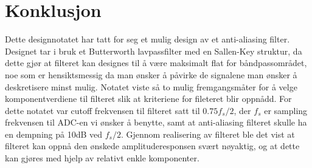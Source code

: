 \newpage
\section{Konklusjon}
\label{konklusjon}

Dette designnotatet har tatt for seg et mulig design av et anti-aliasing filter. Designet tar i bruk et Butterworth lavpassfilter med en Sallen-Key struktur, da dette gjør at filteret kan designes til å være maksimalt flat for båndpassområdet, noe som er 
hensiktsmessig da man ønsker å påvirke de signalene man ønsker å deskretisere minst mulig. Notatet viste så to mulig fremgangsmåter for å velge komponentverdiene til filteret slik at kriteriene for fileteret blir oppnådd. For dette notatet var 
cutoff frekvensen til filteret satt til $0.75 f_s / 2$, der $f_s$ er sampling frekvensen til ADC-en vi ønsker å benytte, samt at anti-aliasing filteret skulle ha en dempning på 10dB ved $f_s/2$. Gjennom realisering av filteret ble det vist at filteret kan 
oppnå den ønskede amplituderesponsen svært nøyaktig, og at dette kan gjøres med hjelp av relativt enkle komponenter. 
